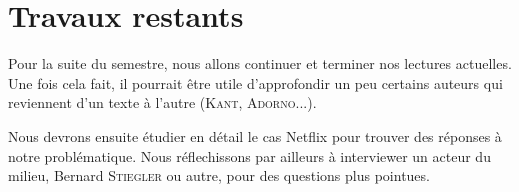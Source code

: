 \documentclass[a4paper,10pt]{article}
\begin{document}
\section{Travaux restants}

Pour la suite du semestre, nous allons continuer et terminer nos lectures actuelles. Une fois cela fait, il pourrait être utile d'approfondir un peu certains auteurs qui reviennent d'un texte à l'autre (\textsc{Kant}, \textsc{Adorno}...).

Nous devrons ensuite étudier en détail le cas Netflix pour trouver des réponses à notre problématique. Nous réflechissons par ailleurs à interviewer un acteur du milieu, Bernard \textsc{Stiegler} ou autre, pour des questions plus pointues.
\end{document}
